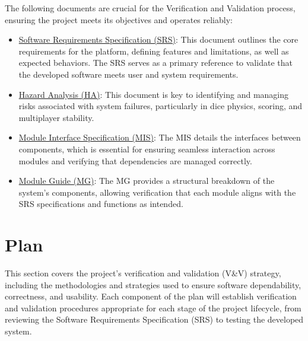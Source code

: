 \documentclass[12pt, titlepage]{article}
\begin{document}
The following documents are crucial for the Verification and Validation process, ensuring the project meets its objectives and operates reliably:

\begin{itemize}
	\item \href{https://github.com/John-Popovici/duel-of-the-eights/blob/main/docs/SRS/SRS.pdf}{Software Requirements Specification (SRS)}: This document outlines the core requirements for the platform, defining features and limitations, as well as expected behaviors. The SRS serves as a primary reference to validate that the developed software meets user and system requirements.
	\item \href{https://github.com/John-Popovici/duel-of-the-eights/blob/main/docs/HazardAnalysis/HazardAnalysis.pdf}{Hazard Analysis (HA)}: This document is key to identifying and managing risks associated with system failures, particularly in dice physics, scoring, and multiplayer stability.
	\item \href{https://github.com/John-Popovici/duel-of-the-eights/blob/main/docs/Design/SoftDetailedDes/MIS.pdf}{Module Interface Specification (MIS)}: The MIS details the interfaces between components, which is essential for ensuring seamless interaction across modules and verifying that dependencies are managed correctly.
	\item \href{https://github.com/John-Popovici/duel-of-the-eights/blob/main/docs/Design/SoftArchitecture/MG.pdf}{Module Guide (MG)}: The MG provides a structural breakdown of the system's components, allowing verification that each module aligns with the SRS specifications and functions as intended.
\end{itemize}


\section{Plan}


\noindent This section covers the project's verification and validation (V\&V) strategy, including the methodologies and strategies used to ensure software dependability, correctness, and usability. Each component of the plan will establish verification and validation procedures appropriate for each stage of the project lifecycle, from reviewing the Software Requirements Specification (SRS) to testing the developed system.
\end{document}
